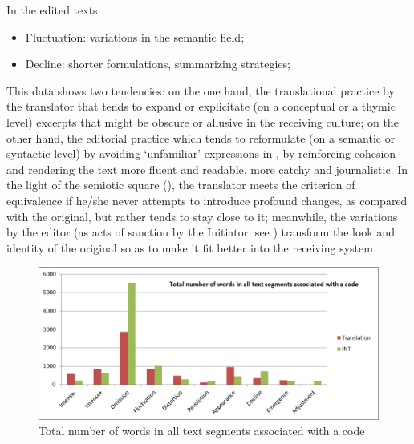 \documentclass[output=paper]{LSP/langsci}
\begin{document}
In the edited texts: 
	
    \begin{itemize}

	\item Fluctuation: variations in the semantic field;

	\item Decline: shorter formulations, summarizing strategies;
    
    \end{itemize}

This data shows two tendencies: on the one hand, the translational practice by the translator that tends to expand or explicitate (on a conceptual or a thymic level) excerpts that might be obscure or allusive in the receiving culture; on the other hand, the editorial practice which tends to reformulate (on a semantic or syntactic level) by avoiding `unfamiliar' expressions in , by reinforcing cohesion and rendering the text more fluent and readable, more catchy and journalistic. In the light of the semiotic square (), the translator meets the criterion of equivalence if he/she never attempts to introduce profound changes, as compared with the original, but rather tends to stay close to it; meanwhile, the variations by the editor (as acts of sanction by the Initiator, see ) transform the look and identity of the original so as to make it fit better into the receiving system.

\begin{figure}
\includegraphics[width=\textwidth]{figures/troqe-marchan/figure4.png}
\caption{Total number of words in all text segments associated with a code}
\label{troqe-marchan:fig:4}
\end{figure}
\end{document}
